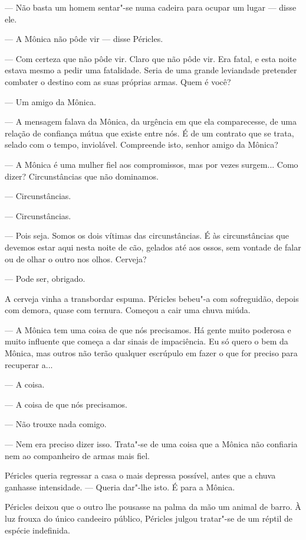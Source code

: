 --- Não basta um homem sentar"-se numa cadeira para ocupar um lugar ---
  disse ele.

--- A Mônica não pôde vir --- disse Péricles.

--- Com certeza que não pôde vir. Claro que não pôde vir. Era fatal, e
  esta noite estava mesmo a pedir uma fatalidade.
Seria de uma grande leviandade pretender combater o destino com as suas
próprias armas. Quem é você?

--- Um amigo da Mônica.

--- A mensagem falava da Mônica, da urgência em que ela comparecesse, de
  uma relação de confiança mútua que existe entre nós. É de um contrato
  que se trata, selado com o tempo, inviolável. Compreende isto, senhor
  amigo da Mônica?

--- A Mônica é uma mulher fiel aos compromissos, mas por vezes surgem...
  Como dizer? Circunstâncias que não dominamos.

--- Circunstâncias.

--- Circunstâncias.

--- Pois seja. Somos os dois vítimas das circunstâncias. É às
  circunstâncias que devemos estar aqui nesta noite de cão, gelados até
  aos ossos, sem vontade de falar ou de olhar o outro nos olhos.
  Cerveja?

--- Pode ser, obrigado.

A cerveja vinha a transbordar espuma. Péricles bebeu"-a com sofreguidão,
depois com demora, quase com ternura. Começou a cair uma chuva miúda.

--- A Mônica tem uma coisa de que nós precisamos. Há gente muito poderosa
  e muito influente que começa a dar sinais de impaciência. Eu só
  quero o bem da Mônica, mas outros não terão qualquer escrúpulo em
  fazer o que for preciso para recuperar a...

--- A coisa.

--- A coisa de que nós precisamos.

--- Não trouxe nada comigo.

--- Nem era preciso dizer isso. Trata"-se de uma coisa que a Mônica não
  confiaria nem ao companheiro de armas mais fiel.

  Péricles queria
  regressar a casa o mais depressa possível, antes que a chuva ganhasse intensidade. --- Queria dar"-lhe isto. É para
a Mônica.

Péricles deixou que o outro lhe pousasse na palma da mão um animal de
barro. À luz frouxa do único candeeiro público, Péricles julgou
tratar"-se de um réptil de espécie indefinida.

